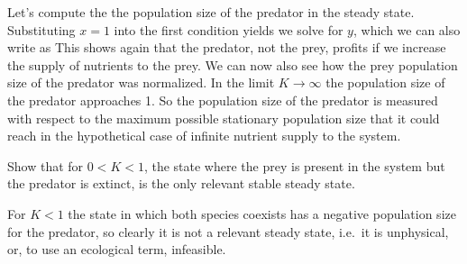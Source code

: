 Let's compute the the population size of the predator in the steady state. Substituting $x=1$ into the first condition yields 
we solve for $y$,
which we can also write as 
This shows again that the predator, not the prey, profits if we increase the supply of nutrients to the prey. We can now also see how the prey population size of the predator was normalized. In the limit $K\to \infty$ the population size of the predator approaches 1. So the population size of the predator is measured with respect to the maximum possible stationary population size that it could reach in the hypothetical case of infinite nutrient supply to the system. 

\subquestion
Show that for $0<K<1$, the state where the prey is present in the system but the predator is extinct, is the only relevant stable steady state. 

\solution
For $K<1$ the state in which both species coexists has a negative population size for the predator, so clearly it is not a relevant steady state, i.e.~it is unphysical, or, to use an ecological term, infeasible. 

